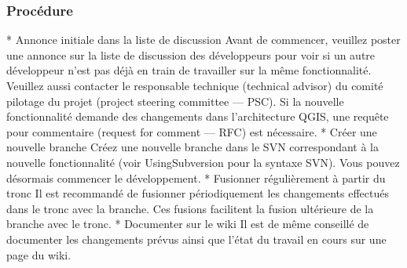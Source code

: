\subsubsection{Proc\'edure}
 * Annonce initiale dans la liste de discussion
 Avant de commencer, veuillez poster une annonce sur la liste de discussion des d\'eveloppeurs pour voir si un autre d\'eveloppeur n'est pas d\'ej\`a en train de travailler sur la m\^eme fonctionnalit\'e. Veuillez aussi contacter le responsable technique (technical advisor) du comit\'e pilotage du projet (project steering committee --- PSC). Si la nouvelle fonctionnalit\'e demande des changements dans l'architecture QGIS, une requ\^ete pour commentaire (request for comment --- RFC) est n\'ecessaire.
 * Cr\'eer une nouvelle branche
Cr\'eez une nouvelle branche dans le SVN correspondant \`a la nouvelle fonctionnalit\'e (voir UsingSubversion pour la syntaxe SVN). Vous pouvez d\'esormais commencer le d\'eveloppement. 
 * Fusionner r\'eguli\`erement \`a partir du tronc
Il est recommand\'e de fusionner p\'eriodiquement les changements effectu\'es dans le tronc avec la branche. Ces fusions facilitent la fusion ult\'erieure de la branche avec le tronc.%
 * Documenter sur le wiki
Il est de m\^eme conseill\'e de documenter les changements pr\'evus ainsi que l'\'etat du travail en cours sur une page du wiki.
